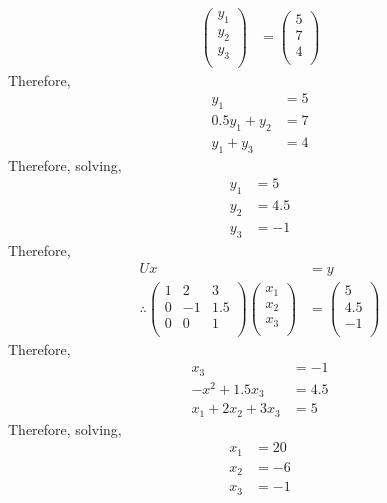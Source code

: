 \documentclass[fleqn, a4paper, 12pt, twoside]{article}
\theoremstyle{definition}
\theoremstyle{theorem}
\begin{document}
\begin{solution}
\begin{enumerate}[leftmargin=*]
\begin{align*}
\begin{pmatrix}
						y_1 \\
						y_2 \\
						y_3 \\
					\end{pmatrix}
				&=
					\begin{pmatrix}
						5 \\
						7 \\
						4 \\
					\end{pmatrix}
			\end{align*}
			Therefore,
			\begin{align*}
				y_1           & = 5 \\
				0.5 y_1 + y_2 & = 7 \\
				y_1 + y_3     & = 4
			\end{align*}
			Therefore, solving,
			\begin{align*}
				y_1 & = 5   \\
				y_2 & = 4.5 \\
				y_3 & = -1
			\end{align*}
			Therefore,
			\begin{align*}
				U x &= y\\
				\therefore
					\begin{pmatrix}
						1 & 2  & 3   \\
						0 & -1 & 1.5 \\
						0 & 0  & 1   \\
					\end{pmatrix}
					\begin{pmatrix}
						x_1 \\
						x_2 \\
						x_3 \\
					\end{pmatrix}
				&=
					\begin{pmatrix}
						5   \\
						4.5 \\
						-1  \\
					\end{pmatrix}
			\end{align*}
			Therefore,
			\begin{align*}
				x_3                 & = -1  \\
				-x^2 + 1.5 x_3      & = 4.5 \\
				x_1 + 2 x_2 + 3 x_3 & = 5
			\end{align*}
			Therefore, solving,
			\begin{align*}
				x_1 & = 20 \\
				x_2 & = -6 \\
				x_3 & = -1
			\end{align*}
	\end{enumerate}
\end{solution}
\end{document}
